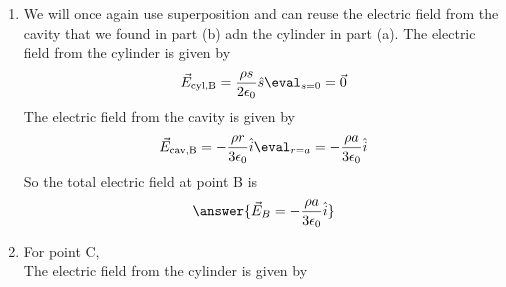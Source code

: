 {\begin{enumerate}
The electric field due to the cylinder is given by
\[\vec{E}_\text{cyl}=\frac{\rho s}{2\epsilon_0}\hat{s}\eval_{s=0}=\vec{0}\]
To find the electric field from the cavity we can treat the cavity like a sphere of radius $a$ with a uniform charge density of $-\rho$. The electric field from this sphere can be computed using Gauss's Law.
\begin{align*}
    &\oiint\vec{E}\cdot d\vec{A}=EA=\frac{Q_\text{enc}}{\epsilon_0}
\end{align*}
We will also need to break this into two parts: the inside of the sphere and the outside of the sphere.\\
For the inside of the sphere,
\begin{align*}
    &Q_\text{enc}=-\rho V_\text{enc}=-\rho\frac{4}{3}\pi r^3\\
    &E_\text{in}A=E_\text{in}(4\pi r^2)=-\frac{\rho\frac{4}{3}\pi r^3}{\epsilon_0}\\
    &E_\text{in}=-\frac{\rho r}{3\epsilon_0}\\
    &\vec{E}_\text{in}=E_\text{in}\hat{r}=-\frac{\rho r}{3\epsilon_0}\hat{r}
\end{align*}
For the outside of the sphere,
\begin{align*}
    &Q_\text{enc}=-\rho V_\text{enc}=-\rho\frac{4}{3}\pi a^3\\
    &E_\text{out}A=E_\text{out}(4\pi r^2)=-\frac{\rho\frac{4}{3}\pi a^3}{\epsilon_0}\\
    &E_\text{out}=-\frac{\rho a^3}{3\epsilon_0r^2}\\
    &\vec{E}_\text{out}=E_\text{out}\hat{r}=-\frac{\rho a^3}{3\epsilon_0r^2}\hat{r}
\end{align*}
At point A, the electric field from the cavity will be
\[\vec{E}=-\frac{\rho r}{3\epsilon_0}\hat{r}\eval_{r=0}=\vec{0}\]
So the total electric field at point A is
\[\answer{\vec{E}_A=\vec{0}}\]
\item We will once again use superposition and can reuse the electric field from the cavity that we found in part (b) adn the cylinder in part (a). The electric field from the cylinder is given by
\[\vec{E}_\text{cyl,B}=\frac{\rho s}{2\epsilon_0}\hat{s}\eval_{s=0}=\vec{0}\]
The electric field from the cavity is given by
\[\vec{E}_\text{cav,B}=-\frac{\rho r}{3\epsilon_0}\hat{i}\eval_{r=a}=-\frac{\rho a}{3\epsilon_0}\hat{i}\]
So the total electric field at point B is
\[\answer{\vec{E}_B=-\frac{\rho a}{3\epsilon_0}\hat{i}}\]
\item For point C,\\
The electric field from the cylinder is given by

\end{enumerate}}
